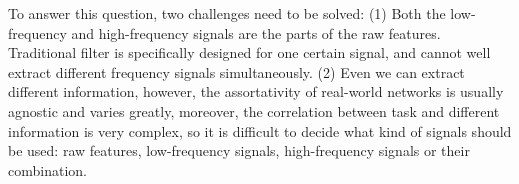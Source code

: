 \documentclass[letterpaper]{article} %
\begin{document}



To answer this question, two challenges need to be solved:
(1) Both the low-frequency and high-frequency signals are the parts of the raw features. Traditional filter is specifically designed for one certain signal, and cannot well extract different frequency signals  simultaneously.
(2) Even we can extract different information, however, the assortativity of real-world networks is usually agnostic and varies greatly, moreover, the correlation between task and different information is very complex, so it is difficult to decide what kind of signals should be used: raw features, low-frequency signals, high-frequency signals or their combination.
\end{document}
